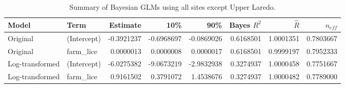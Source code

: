 \begin{table}
\centering
\caption{Summary of Bayesian GLMs using all sites except Upper Laredo.}
\centering
\begin{tabular}[t]{llrrrrrr}
\toprule
Model & Term & Estimate & 10\% & 90\% & Bayes $R^2$ & $\hat{R}$ & $n_{eff}$\\
\midrule
Original & (Intercept) & -0.3921237 & -0.6968697 & -0.0869026 & 0.6168501 & 1.0001351 & 0.7803667\\
Original & farm_lice & 0.0000013 & 0.0000008 & 0.0000017 & 0.6168501 & 0.9999197 & 0.7952333\\
Log-transformed & (Intercept) & -6.0275382 & -9.0673219 & -2.9832938 & 0.3274937 & 1.0000458 & 0.7751667\\
Log-transformed & farm_lice & 0.9161502 & 0.3791072 & 1.4538676 & 0.3274937 & 1.0000482 & 0.7789000\\
\bottomrule
\end{tabular}
\end{table}
